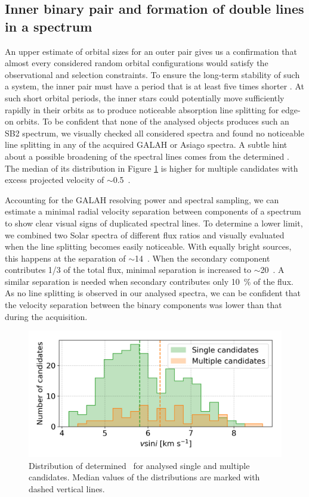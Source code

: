 \subsection{Inner binary pair and formation of double lines in a spectrum}
\label{sec:orbits_sb2}
An upper estimate of orbital sizes for an outer pair gives us a confirmation that almost every considered random orbital configurations would satisfy the observational and selection constraints. To ensure the long-term stability of such a system, the inner pair must have a period that is at least five times shorter \citep{2006epbm.book.....E}. At such short orbital periods, the inner stars could potentially move sufficiently rapidly in their orbits as to produce noticeable absorption line splitting for edge-on orbits. To be confident that none of the analysed objects produces such an SB2 spectrum, we visually checked all considered spectra and found no noticeable line splitting in any of the acquired GALAH or Asiago spectra. A subtle hint about a possible broadening of the spectral lines comes from the determined \vsin. The median of its distribution in Figure \ref{fig:vsini_hist} is higher for multiple candidates with excess projected velocity of $\sim$0.5~\kms.

Accounting for the GALAH resolving power and spectral sampling, we can estimate a minimal radial velocity separation between components of a spectrum to show clear visual signs of duplicated spectral lines. To determine a lower limit, we combined two Solar spectra of different flux ratios and visually evaluated when the line splitting becomes easily noticeable. With equally bright sources, this happens at the separation of $\sim$14~\kms. When the secondary component contributes 1/3 of the total flux, minimal separation is increased to $\sim$20~\kms. A similar separation is needed when secondary contributes only 10~\% of the flux. As no line splitting is observed in our analysed spectra, we can be confident that the velocity separation between the binary components was lower than that during the acquisition.

\begin{figure}
	\centering
	\includegraphics[width=\columnwidth]{hist_Vsini_cannon_ebv_c3_07.png}
	\caption{Distribution of determined \vsin\ for analysed single and multiple candidates. Median values of the distributions are marked with dashed vertical lines.}
	\label{fig:vsini_hist}
\end{figure}

